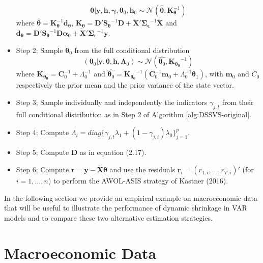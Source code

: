 \documentclass[
  12pt,
]{book}
\theoremstyle{break}
\theoremstyle{nonumberplain}
\begin{document}
\begin{itemize}
\[\boldsymbol{\theta} | \boldsymbol{y},\boldsymbol{h},\boldsymbol{\gamma},\boldsymbol{\theta}_{0},\boldsymbol{h}_{0} \sim \mathcal{N}(\hat{\boldsymbol{\theta}},\boldsymbol{K}^{-1}_{\boldsymbol{\theta}})\]
where $\hat{\boldsymbol{\theta}}=\boldsymbol{K}^{-1}_{\boldsymbol{\theta}}\boldsymbol{d}_{\boldsymbol{\theta}}$, $\boldsymbol{K_\theta}=\boldsymbol{D}'\boldsymbol{S_\theta}^{-1}\boldsymbol{D}+\tilde{\boldsymbol{X}}'\boldsymbol{\Sigma_\epsilon}^{-1}\tilde{\boldsymbol{X}}$ and $\boldsymbol{d_\theta}=\boldsymbol{D}'\boldsymbol{S_\theta}^{-1}\boldsymbol{D}\boldsymbol{\alpha}_{0}+\tilde{\boldsymbol{X}}'\boldsymbol{\Sigma_{\epsilon}}^{-1}\boldsymbol{y}$.
\item Step 2; Sample $\boldsymbol{\theta}_{0}$ from the full conditional distribution 
\[
(\boldsymbol{\theta}_{0}|\boldsymbol{y},\boldsymbol{\theta},\boldsymbol{h},\boldsymbol{\Lambda}_{0})\sim\mathcal{N}(\hat{\boldsymbol{\theta}_{0}},\boldsymbol{K_{\theta_{0}}}^{-1})
\]
where $\boldsymbol{K_{\theta_{0}}}=\boldsymbol{C}_{0}^{-1}+\Lambda^{-1}_{0}$ and $\hat{\boldsymbol{\theta}_{0}}=\boldsymbol{K_{\theta_{0}}}^{-1}(\boldsymbol{C}_{0}^{-1}\boldsymbol{m}_{0}+\Lambda_{0}^{-1}\boldsymbol{\theta}_{1})$, with $\boldsymbol{m}_{0}$ and $C_{0}$ respectively the prior mean and the prior variance of the state vector.
\item Step 3; Sample individually and independently the indicators $\gamma_{j,t}$ from their full conditional distribution as in Step 2 of Algorithm \ref{alg:DSSVS-original}.
\item Step 4; Compute $\Lambda_{t}=diag\{\gamma_{j,t}\lambda_{1}+(1-\gamma_{j,t})\lambda_{0}\}_{j=1}^{p}$.
\item Step 5; Compute $\boldsymbol{D}$ as in equation (2.17).
\item Step 6; Compute $\boldsymbol{r}=\boldsymbol{y}-\tilde{\boldsymbol{X}}\boldsymbol{\theta}$ and use the residuals $\boldsymbol{r}_{i}=(r_{1,i},...,r_{T,i})'$ (for $i=1,...,n$) to perform the AWOL-ASIS strategy of Kastner (2016).
\end{itemize}

In the following section we provide an empirical example on
macroeconomic data that will be useful to illustrate the performance of
dynamic shrinkage in VAR models and to compare these two alternative
estimation strategies.

\section{Macroeconomic Data}\label{MD3}
\end{document}
